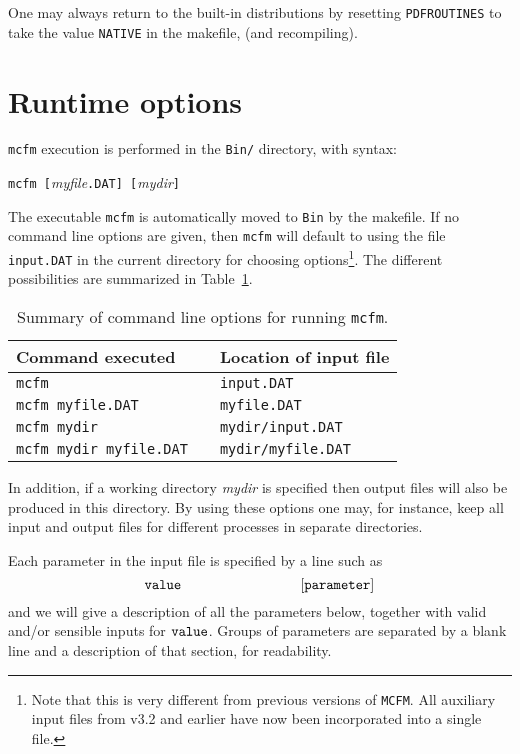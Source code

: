 \documentclass[12pt]{article}
\begin{document}
One may always return to the built-in distributions by resetting
{\tt PDFROUTINES} to take the value {\tt NATIVE}  in the makefile,
(and recompiling).
\clearpage
\section{Runtime options}

{\tt mcfm} execution is performed in the {\tt Bin/} directory,
with syntax:
\begin{center}
{\tt mcfm [}{\it myfile}{\tt .DAT] [}{\it mydir}{\tt ]}
\end{center}
The executable {\tt mcfm} is automatically moved to {\tt Bin} by the makefile.
If no command line options are given, then {\tt mcfm} will default
to using the file {\tt input.DAT} in the current directory for
choosing options\footnote{Note that this is very different from
previous versions of {\tt MCFM}. All auxiliary input files from v3.2 and
earlier have now been incorporated into a single file.}.
The different possibilities are summarized in Table~\ref{clopts}.
\begin{table}
\begin{center}
\begin{tabular}{l|cl}
Command executed && Location of input file \\
\hline
{\tt mcfm}                      && {\tt input.DAT} \\
{\tt mcfm myfile.DAT}           && {\tt myfile.DAT} \\
{\tt mcfm mydir}                && {\tt mydir/input.DAT} \\
{\tt mcfm mydir myfile.DAT}     && {\tt mydir/myfile.DAT} \\
\end{tabular}
\end{center}
\caption{Summary of command line options for running {\tt mcfm}.}
\label{clopts}
\end{table}
In addition, if a working directory {\it mydir} is specified then
output files will also be produced in this directory. By using these
options one may, for instance, keep all input and output files for
different processes in separate directories.

Each parameter in the input file is specified by a line such as
\begin{displaymath}
{\tt value} \hspace{3cm} {\tt [parameter]}
\end{displaymath}
and we will give a description of all the parameters below, together with
valid and/or sensible inputs for ${\tt value}$. Groups of parameters
are separated by a blank line and a description of that section, for
readability.
\end{document}
